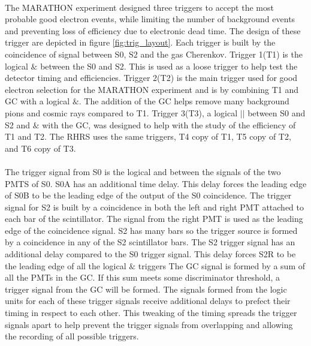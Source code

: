 \paragraph{} The MARATHON experiment designed three triggers to accept the most probable good electron events, while limiting the number of background events and preventing loss of efficiency due to electronic dead time. The design of these trigger are depicted in figure \ref{fig:trig_layout}. Each trigger is built by the coincidence of signal between S0, S2 and the gas Cherenkov.  Trigger 1(T1) is the logical $\&$ between the S0 and S2. This is used as a loose trigger to help test the detector timing and efficiencies.  Trigger 2(T2) is the main trigger used for good electron selection for the MARATHON experiment and is by  combining T1 and GC with a logical $\&$. The addition of the GC helps remove many background pions and cosmic rays compared to T1. Trigger 3(T3), a logical $||$ between S0 and S2 and $\&$ with the GC, was designed to help with the study of the efficiency of T1 and T2. The RHRS uses the same triggers, T4 copy of T1, T5 copy of T2, and T6 copy of T3.

\paragraph{}The trigger signal from  S0 is the logical and between the signals of the two PMTS of S0. S0A has an additional time delay. This delay forces the leading edge of S0B to be the leading edge of the output of the S0 coincidence. The trigger signal for S2 is built by a coincidence in both the left and right PMT attached to each bar of the scintillator. The signal from the right PMT is used as the leading edge of the coincidence signal. S2 has many bars so the trigger source is formed by a coincidence in any of the S2 scintillator bars. The S2 trigger signal has an additional delay compared to the S0 trigger signal. This delay forces S2R to be the leading edge of all the logical $\&$ triggers The GC signal is formed by a sum of all the PMTs in the GC. If this sum meets some discriminator threshold, a trigger signal from the GC will be formed. The signals formed from the logic units for each of these trigger signals receive additional delays to prefect their timing in respect to each other. This tweaking of the timing spreads the trigger signals apart to help prevent the trigger signals from overlapping and allowing the recording of all possible triggers. 
 

